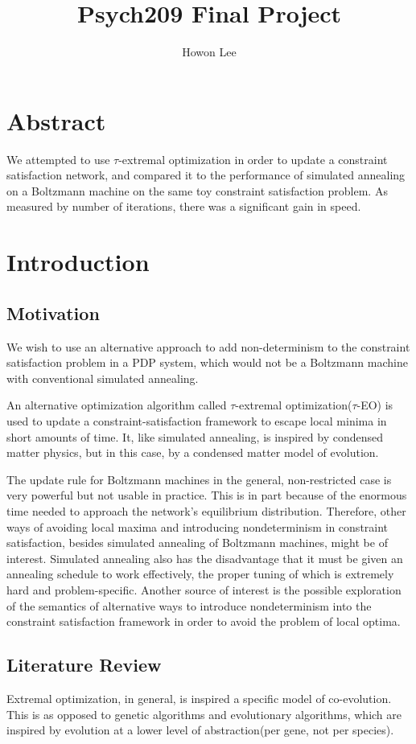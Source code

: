 \documentclass[12pt]{article}
\begin{document}
\title{Psych209 Final Project}
\author{Howon Lee}
\maketitle
\section*{Abstract}
We attempted to use $\tau$-extremal optimization in order to update a constraint satisfaction network, and compared it to the performance of simulated annealing on a Boltzmann machine on the same toy constraint satisfaction problem. As measured by number of iterations, there was a significant gain in speed.
\section*{Introduction}

\subsection*{Motivation}
We wish to use an alternative approach to add non-determinism to the constraint satisfaction problem in a PDP system, which would not be a Boltzmann machine with conventional simulated annealing.

An alternative optimization algorithm called $\tau$-extremal optimization($\tau$-EO) is used to update a constraint-satisfaction framework to escape local minima in short amounts of time. It, like simulated annealing, is inspired by condensed matter physics, but in this case, by a condensed matter model of evolution.

The update rule for Boltzmann machines in the general, non-restricted case is very powerful but not usable in practice. This is in part because of the enormous time needed to approach the network's equilibrium distribution. Therefore, other ways of avoiding local maxima and introducing nondeterminism in constraint satisfaction, besides simulated annealing of Boltzmann machines, might be of interest. Simulated annealing also has the disadvantage that it must be given an annealing schedule to work effectively, the proper tuning of which is extremely hard and problem-specific. Another source of interest is the possible exploration of the semantics of alternative ways to introduce nondeterminism into the constraint satisfaction framework in order to avoid the problem of local optima.

\subsection*{Literature Review}
Extremal optimization\cite{boettcher}, in general, is inspired a specific model of co-evolution. This is as opposed to genetic algorithms and evolutionary algorithms\cite{ga}, which are inspired by evolution at a lower level of abstraction(per gene, not per species).
\end{document}
